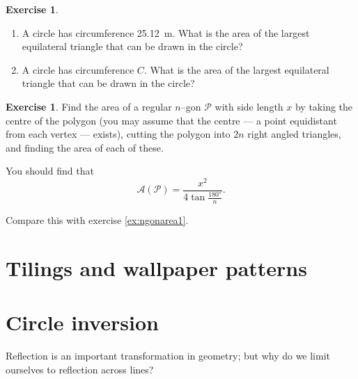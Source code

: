 \documentclass[a4paper]{report}
\theoremstyle{definition}
\newtheorem{exercise}[thm]{Exercise}
\begin{document}
  \begin{exercise}\leavevmode
    \begin{enumerate}
      \item A circle has circumference \SI{25.12}{\metre}. What is the area of the largest equilateral triangle that can be drawn in the circle?
      \item A circle has circumference $ C $. What is the area of the largest equilateral triangle that can be drawn in the circle?
    \end{enumerate}
  \end{exercise}

  \begin{exercise}\label{ex:ngonarea2}
    Find the area of a regular $ n$--gon $ \mathscr{P} $ with side length $ x $ by taking the centre of the polygon (you may assume
    that the centre --- a point equidistant from each vertex --- exists), cutting the polygon into $ 2n $ right angled
    triangles, and finding the area of each of these.

    You should find that
    \begin{equation}
      \mathcal{A}(\mathscr{P}) = \frac{x^2}{4\tan \frac{\ang{180}}{n}}.
    \end{equation}

    Compare this with exercise \ref{ex:ngonarea1}.
  \end{exercise}

  \chapter{Tilings and wallpaper patterns}

  \chapter{Circle inversion}
  Reflection is an important transformation in geometry; but why do we limit ourselves
  to reflection across lines?
\end{document}
